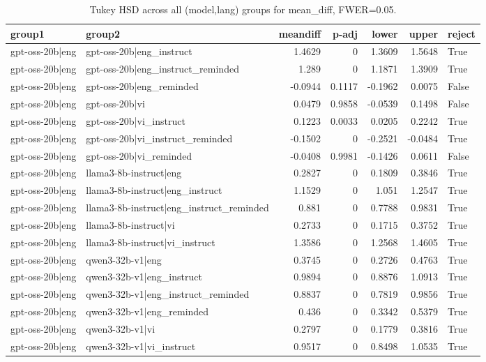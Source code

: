 \begin{table}
\caption{Tukey HSD across all (model,lang) groups for mean_diff, FWER=0.05.}
\label{tab:tukey_all_models_all_langs_mean_diff}
\begin{tabular}{l l r r r r l}
\toprule
group1 & group2 & meandiff & p-adj & lower & upper & reject \\
\midrule
gpt-oss-20b|eng & gpt-oss-20b|eng_instruct & 1.4629 & 0 & 1.3609 & 1.5648 & True \\
gpt-oss-20b|eng & gpt-oss-20b|eng_instruct_reminded & 1.289 & 0 & 1.1871 & 1.3909 & True \\
gpt-oss-20b|eng & gpt-oss-20b|eng_reminded & -0.0944 & 0.1117 & -0.1962 & 0.0075 & False \\
gpt-oss-20b|eng & gpt-oss-20b|vi & 0.0479 & 0.9858 & -0.0539 & 0.1498 & False \\
gpt-oss-20b|eng & gpt-oss-20b|vi_instruct & 0.1223 & 0.0033 & 0.0205 & 0.2242 & True \\
gpt-oss-20b|eng & gpt-oss-20b|vi_instruct_reminded & -0.1502 & 0 & -0.2521 & -0.0484 & True \\
gpt-oss-20b|eng & gpt-oss-20b|vi_reminded & -0.0408 & 0.9981 & -0.1426 & 0.0611 & False \\
gpt-oss-20b|eng & llama3-8b-instruct|eng & 0.2827 & 0 & 0.1809 & 0.3846 & True \\
gpt-oss-20b|eng & llama3-8b-instruct|eng_instruct & 1.1529 & 0 & 1.051 & 1.2547 & True \\
gpt-oss-20b|eng & llama3-8b-instruct|eng_instruct_reminded & 0.881 & 0 & 0.7788 & 0.9831 & True \\
gpt-oss-20b|eng & llama3-8b-instruct|vi & 0.2733 & 0 & 0.1715 & 0.3752 & True \\
gpt-oss-20b|eng & llama3-8b-instruct|vi_instruct & 1.3586 & 0 & 1.2568 & 1.4605 & True \\
gpt-oss-20b|eng & qwen3-32b-v1|eng & 0.3745 & 0 & 0.2726 & 0.4763 & True \\
gpt-oss-20b|eng & qwen3-32b-v1|eng_instruct & 0.9894 & 0 & 0.8876 & 1.0913 & True \\
gpt-oss-20b|eng & qwen3-32b-v1|eng_instruct_reminded & 0.8837 & 0 & 0.7819 & 0.9856 & True \\
gpt-oss-20b|eng & qwen3-32b-v1|eng_reminded & 0.436 & 0 & 0.3342 & 0.5379 & True \\
gpt-oss-20b|eng & qwen3-32b-v1|vi & 0.2797 & 0 & 0.1779 & 0.3816 & True \\
gpt-oss-20b|eng & qwen3-32b-v1|vi_instruct & 0.9517 & 0 & 0.8498 & 1.0535 & True \\

\end{tabular}
\end{table}
